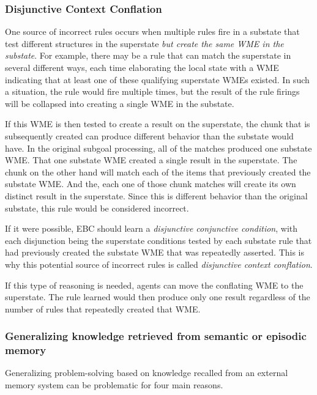 \subsubsection{Disjunctive Context Conflation}

One source of incorrect rules occurs when multiple rules fire in a substate that test different structures in the superstate \emph{but create the same WME in the substate}. For example, there may be a rule that can match the superstate in several different ways, each time elaborating the local state with a WME indicating that at least one of these qualifying superstate WMEs existed. In such a situation, the rule would fire multiple times, but the result of the rule firings will be collapsed into creating a single WME in the substate. 

If this WME is then tested to create a result on the superstate, the chunk that is subsequently created can produce different behavior than the substate would have. In the original subgoal processing, all of the matches produced one substate WME.  That one substate WME created a single result in the superstate.  The chunk on the other hand will match each of the items that previously created the substate WME.  And the, each one of those chunk matches will create its own distinct result in the superstate.   Since this is different behavior than the original substate, this rule would be considered incorrect. 

If it were possible, EBC should learn a \textit{disjunctive conjunctive condition}, with each disjunction being the superstate conditions tested by each substate rule that had previously created the substate WME that was repeatedly asserted.  This is why this potential source of incorrect rules is called \textit{disjunctive context conflation}.

If this type of reasoning is needed, agents can move the conflating WME to the superstate.  The rule learned would then produce only one result regardless of the number of rules that repeatedly created that WME. 

\subsubsection{Generalizing knowledge retrieved from semantic or episodic memory}

Generalizing problem-solving based on knowledge recalled from an external memory system can be problematic for four main reasons.

